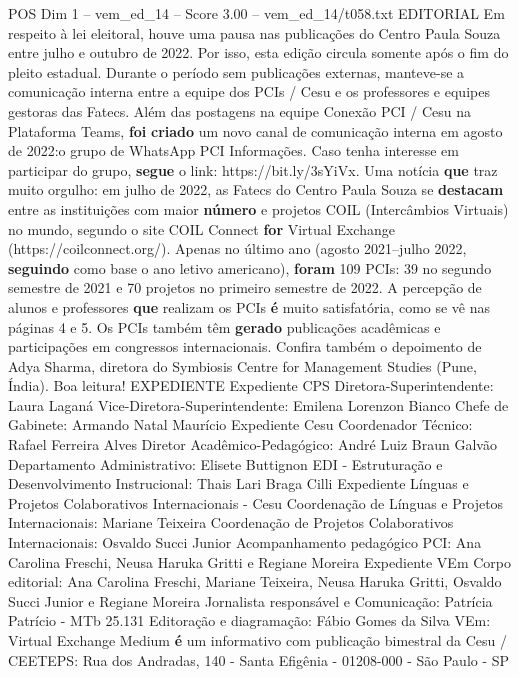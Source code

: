 \begin{textsample}{POS Dim 1 – vem\_ed\_14 – Score 3.00 – vem\_ed\_14/t058.txt}  \label{ex:f1_pos_156}
EDITORIAL Em respeito à lei eleitoral, houve uma pausa nas publicações do Centro Paula Souza entre julho e outubro de 2022.
Por isso, esta edição circula somente após o fim do pleito estadual.
Durante o período sem publicações externas, manteve-se a comunicação interna entre a equipe dos PCIs / Cesu e os professores e equipes gestoras das Fatecs.
Além das postagens na equipe Conexão PCI / Cesu na Plataforma Teams, \textbf{foi} \textbf{criado} um novo canal de comunicação interna em agosto de 2022:o grupo de WhatsApp PCI Informações.
Caso tenha interesse em participar do grupo, \textbf{segue} o link: https://bit.ly/3sYiVx.
Uma notícia \textbf{que} traz muito orgulho: em julho de 2022, as Fatecs do Centro Paula Souza se \textbf{destacam} entre as instituições com maior \textbf{número} e projetos COIL (Intercâmbios Virtuais) no mundo, segundo o site COIL Connect \textbf{for} Virtual Exchange (https://coilconnect.org/).
Apenas no último ano (agosto 2021–julho 2022, \textbf{seguindo} como base o ano letivo americano), \textbf{foram} 109 PCIs: 39 no segundo semestre de 2021 e 70 projetos no primeiro semestre de 2022.
A percepção de alunos e professores \textbf{que} realizam os PCIs \textbf{é} muito satisfatória, como se vê nas páginas 4 e 5.
Os PCIs também têm \textbf{gerado} publicações acadêmicas e participações em congressos internacionais.
Confira também o depoimento de Adya Sharma, diretora do Symbiosis Centre for Management Studies (Pune, Índia).
Boa leitura!
EXPEDIENTE Expediente CPS Diretora-Superintendente: Laura Laganá Vice-Diretora-Superintendente: Emilena Lorenzon Bianco Chefe de Gabinete: Armando Natal Maurício Expediente Cesu Coordenador Técnico: Rafael Ferreira Alves Diretor Acadêmico-Pedagógico: André Luiz Braun Galvão Departamento Administrativo: Elisete Buttignon EDI - Estruturação e Desenvolvimento Instrucional: Thais Lari Braga Cilli Expediente Línguas e Projetos Colaborativos Internacionais - Cesu Coordenação de Línguas e Projetos Internacionais: Mariane Teixeira Coordenação de Projetos Colaborativos Internacionais: Osvaldo Succi Junior Acompanhamento pedagógico PCI: Ana Carolina Freschi, Neusa Haruka Gritti e Regiane Moreira Expediente VEm Corpo editorial: Ana Carolina Freschi, Mariane Teixeira, Neusa Haruka Gritti, Osvaldo Succi Junior e Regiane Moreira Jornalista responsável e Comunicação: Patrícia Patrício - MTb 25.131 Editoração e diagramação: Fábio Gomes da Silva VEm: Virtual Exchange Medium \textbf{é} um informativo com publicação bimestral da Cesu / CEETEPS: Rua dos Andradas, 140 - Santa Efigênia - 01208-000 - São Paulo - SP

\end{textsample}
